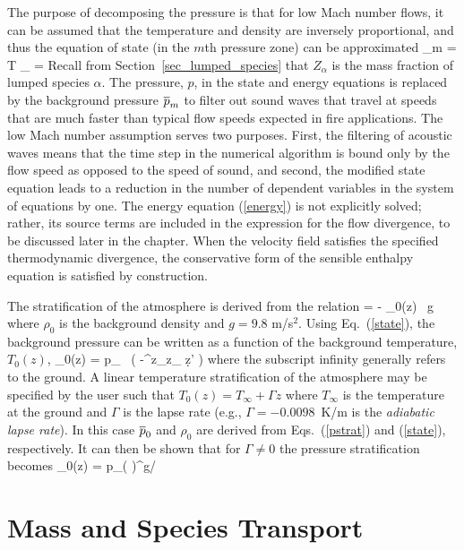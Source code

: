 The purpose of decomposing the pressure is that for low Mach number flows, it can be assumed that the temperature and density are inversely
proportional, and thus the equation of state (in the $m$th pressure zone) can be approximated
\be \bp_m  =  \rho T \R \sum_\alpha {} =   \label{state} \ee
Recall from Section~\ref{sec_lumped_species} that $Z_\alpha$ is the mass fraction of lumped species $\alpha$.
The pressure, $p$, in the state and energy equations is replaced by the background pressure $\overline{p}_m$ to filter out sound waves
that travel at speeds that are much faster
than typical flow speeds expected in fire applications. The low Mach number assumption serves two purposes. First, the filtering of acoustic waves
means that the time step in the numerical algorithm is bound only by the flow speed as opposed to the speed of sound, and second, the modified state
equation leads to a reduction in the number of dependent variables in the system of equations by one. The energy equation (\ref{energy}) is not
explicitly solved; rather, its source terms are included in the expression for the flow divergence, to be discussed later in the chapter.  When the velocity field satisfies the specified thermodynamic divergence, the conservative form of the sensible enthalpy equation is satisfied by construction.

The stratification of the atmosphere is derived from the relation
\be {} = - \rho_0(z) \, g  \ee
where $\rho_0$ is the background density and $g=9.8$ m/s$^2$. Using Eq.~(\ref{state}), the background pressure can be written as a function of the background temperature, $T_0(z)$,
\be \bp_0(z) = p_\infty \; \exp \, \left( -\int^z_{z_\infty}  \d z' \right)  \label{pstrat} \ee
where the subscript infinity generally refers to the ground. A linear temperature stratification of the atmosphere may be
specified by the user such that $T_0(z) = T_\infty + \Gamma z$ where $T_\infty$ is the temperature at the ground and
$\Gamma$ is the lapse rate (e.g., $\Gamma = -0.0098$~K/m is the {\em adiabatic lapse rate}).
In this case $\overline{p}_0$ and $\rho_0$ are derived from Eqs.~(\ref{pstrat}) and (\ref{state}), respectively.
It can then be shown that for $\Gamma \ne 0$ the pressure stratification becomes
\be
   \bp_0(z) = p_\infty  \left(  \right)^{g/\R \Gamma}
   \label{pstrat2}
\ee


\section{Mass and Species Transport}

